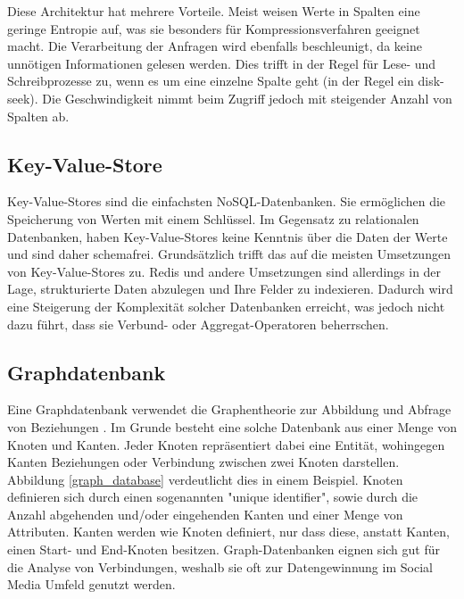 Diese Architektur hat mehrere Vorteile. Meist weisen Werte in Spalten eine geringe Entropie auf, was sie besonders für Kompressionsverfahren geeignet macht. Die Verarbeitung der Anfragen wird ebenfalls beschleunigt, da keine unnötigen Informationen gelesen werden. Dies trifft in der Regel für Lese- und Schreibprozesse zu, wenn es um eine einzelne Spalte geht (in der Regel ein disk-seek). Die Geschwindigkeit nimmt beim Zugriff jedoch mit steigender Anzahl von Spalten ab.

\subsection{Key-Value-Store}
\label{ch:grundlagen:sec:NoSQL:KeyValueStore}

Key-Value-Stores sind die einfachsten NoSQL-Datenbanken. Sie ermöglichen die Speicherung von Werten mit einem Schlüssel. Im Gegensatz zu relationalen Datenbanken, haben Key-Value-Stores keine Kenntnis über die Daten der Werte und sind daher schemafrei. Grundsätzlich trifft das auf die meisten Umsetzungen von Key-Value-Stores zu. Redis und andere Umsetzungen sind allerdings in der Lage, strukturierte Daten abzulegen und Ihre Felder zu indexieren. Dadurch wird eine Steigerung der Komplexität solcher Datenbanken erreicht, was jedoch nicht dazu führt, dass sie Verbund- oder Aggregat-Operatoren beherrschen. 

\subsection{Graphdatenbank}
\label{ch:grundlagen:sec:NoSQL:GraphDatenbanken}

Eine Graphdatenbank verwendet die Graphentheorie zur Abbildung und Abfrage von Beziehungen \cite{SWB-386976589}. Im Grunde besteht eine solche Datenbank aus einer Menge von Knoten und Kanten. Jeder Knoten repräsentiert dabei eine Entität, wohingegen Kanten Beziehungen oder Verbindung zwischen zwei Knoten darstellen. Abbildung \ref{graph_database} verdeutlicht dies in einem Beispiel. Knoten definieren sich durch einen sogenannten "unique identifier", sowie durch die Anzahl abgehenden und/oder eingehenden Kanten und einer Menge von Attributen. Kanten werden wie Knoten definiert, nur dass diese, anstatt Kanten, einen Start- und End-Knoten besitzen. Graph-Datenbanken eignen sich gut für die Analyse von Verbindungen, weshalb sie oft zur Datengewinnung im Social Media Umfeld genutzt werden.

